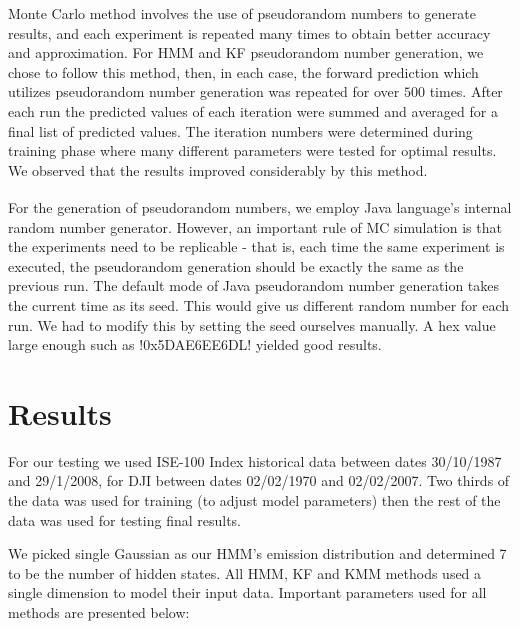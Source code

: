 Monte Carlo method involves the use of pseudorandom numbers to generate results,
and each experiment is repeated many times to obtain better accuracy and
approximation. For HMM and KF pseudorandom number generation, we chose to follow
this method, then, in each case, the forward prediction which utilizes
pseudorandom number generation was repeated for over $500$ times. After each run
the predicted values of each iteration were summed and averaged for a final list
of predicted values. The iteration numbers were determined during training phase
where many different parameters were tested for optimal results. We observed
that the results improved considerably by this method.

For the generation of pseudorandom numbers, we employ Java
\textsuperscript{\textregistered} language's internal random number
generator. However, an important rule of MC simulation is that the experiments
need to be replicable - that is, each time the same experiment is executed, the
pseudorandom generation should be exactly the same as the previous run. The
default mode of Java pseudorandom number generation takes the current time as
its seed. This would give us different random number for each run. We had to
modify this by setting the seed ourselves manually. A hex value large enough
such as \PVerb!0x5DAE6EE6DL!  yielded good results.


\section{Results}

For our testing we used ISE-100 Index historical data between dates 30/10/1987
and 29/1/2008, for DJI between dates 02/02/1970 and 02/02/2007. Two thirds of
the data was used for training (to adjust model parameters) then the rest of the
data was used for testing final results.

We picked single Gaussian as our HMM's emission distribution and determined 7 to
be the number of hidden states. All HMM, KF and KMM methods used a single
dimension to model their input data. Important parameters used for all methods
are presented below:


